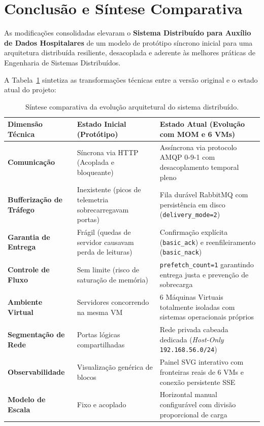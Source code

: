 \documentclass[11pt,a4paper]{article}
\begin{document}
\section{Conclusão e Síntese Comparativa}

As modificações consolidadas elevaram o \textbf{Sistema Distribuído para Auxílio de Dados Hospitalares} de um modelo de protótipo síncrono inicial para uma arquitetura distribuída resiliente, desacoplada e aderente às melhores práticas de Engenharia de Sistemas Distribuídos. 

A Tabela~\ref{tab:comparativo_evolucao} sintetiza as transformações técnicas entre a versão original e o estado atual do projeto:

\begin{table}[H]
\centering
\small
\begin{tabularx}{\textwidth}{l X X}
\toprule
\textbf{Dimensão Técnica} & \textbf{Estado Inicial (Protótipo)} & \textbf{Estado Atual (Evolução com MOM e 6 VMs)} \\
\midrule
\textbf{Comunicação} & Síncrona via HTTP (Acoplada e bloqueante) & Assíncrona via protocolo AMQP 0-9-1 com desacoplamento temporal pleno \\
\addlinespace
\textbf{Bufferização de Tráfego} & Inexistente (picos de telemetria sobrecarregavam portas) & Fila durável RabbitMQ com persistência em disco (\texttt{delivery\_mode=2}) \\
\addlinespace
\textbf{Garantia de Entrega} & Frágil (quedas de servidor causavam perda de leituras) & Confirmação explícita (\texttt{basic\_ack}) e reenfileiramento (\texttt{basic\_nack}) \\
\addlinespace
\textbf{Controle de Fluxo} & Sem limite (risco de saturação de memória) & \texttt{prefetch\_count=1} garantindo entrega justa e prevenção de sobrecarga \\
\addlinespace
\textbf{Ambiente Virtual} & Servidores concorrendo na mesma VM & 6 Máquinas Virtuais totalmente isoladas com sistemas operacionais próprios \\
\addlinespace
\textbf{Segmentação de Rede} & Portas lógicas compartilhadas & Rede privada cabeada dedicada (\textit{Host-Only} \texttt{192.168.56.0/24}) \\
\addlinespace
\textbf{Observabilidade} & Visualização genérica de blocos & Painel SVG interativo com fronteiras reais de 6 VMs e conexão persistente SSE \\
\addlinespace
\textbf{Modelo de Escala} & Fixo e acoplado & Horizontal manual configurável com divisão proporcional de carga \\
\bottomrule
\end{tabularx}
\caption{Síntese comparativa da evolução arquitetural do sistema distribuído.}
\label{tab:comparativo_evolucao}
\end{table}
\end{document}
